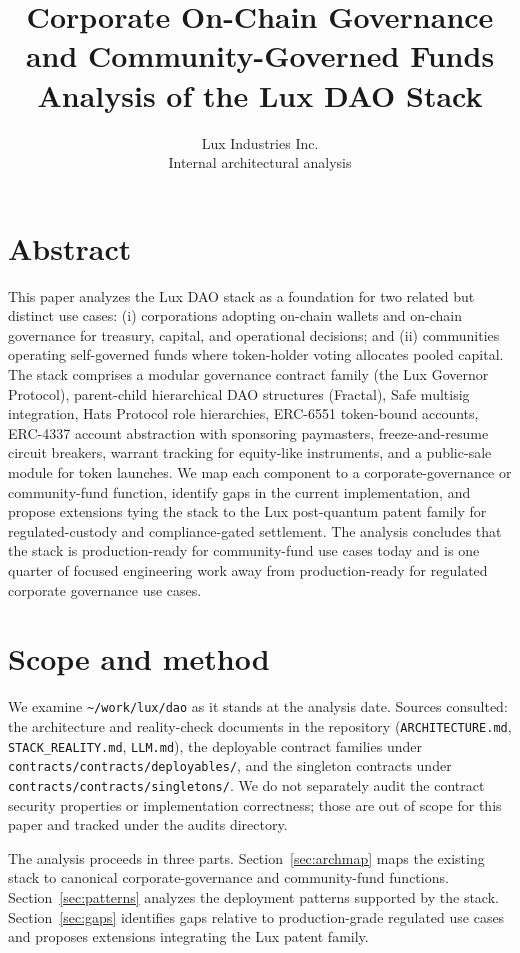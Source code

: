 \documentclass[11pt,letterpaper]{article}
\title{\textbf{Corporate On-Chain Governance and Community-Governed Funds}\\[6pt]
\large Analysis of the Lux DAO Stack}
\author{Lux Industries Inc.\\[2pt]\small Internal architectural analysis}
\date{}
\begin{document}
\luxcoverpage
\maketitle

\section*{Abstract}

This paper analyzes the Lux DAO stack as a foundation for two related but distinct use cases: (i) corporations adopting on-chain wallets and on-chain governance for treasury, capital, and operational decisions; and (ii) communities operating self-governed funds where token-holder voting allocates pooled capital. The stack comprises a modular governance contract family (the Lux Governor Protocol), parent-child hierarchical DAO structures (Fractal), Safe multisig integration, Hats Protocol role hierarchies, ERC-6551 token-bound accounts, ERC-4337 account abstraction with sponsoring paymasters, freeze-and-resume circuit breakers, warrant tracking for equity-like instruments, and a public-sale module for token launches. We map each component to a corporate-governance or community-fund function, identify gaps in the current implementation, and propose extensions tying the stack to the Lux post-quantum patent family for regulated-custody and compliance-gated settlement. The analysis concludes that the stack is production-ready for community-fund use cases today and is one quarter of focused engineering work away from production-ready for regulated corporate governance use cases.

\section{Scope and method}

We examine \texttt{\textasciitilde/work/lux/dao} as it stands at the analysis date. Sources consulted: the architecture and reality-check documents in the repository (\texttt{ARCHITECTURE.md}, \texttt{STACK\_REALITY.md}, \texttt{LLM.md}), the deployable contract families under \texttt{contracts/contracts/deployables/}, and the singleton contracts under \texttt{contracts/contracts/singletons/}. We do not separately audit the contract security properties or implementation correctness; those are out of scope for this paper and tracked under the audits directory.

The analysis proceeds in three parts. Section~\ref{sec:archmap} maps the existing stack to canonical corporate-governance and community-fund functions. Section~\ref{sec:patterns} analyzes the deployment patterns supported by the stack. Section~\ref{sec:gaps} identifies gaps relative to production-grade regulated use cases and proposes extensions integrating the Lux patent family.
\end{document}
